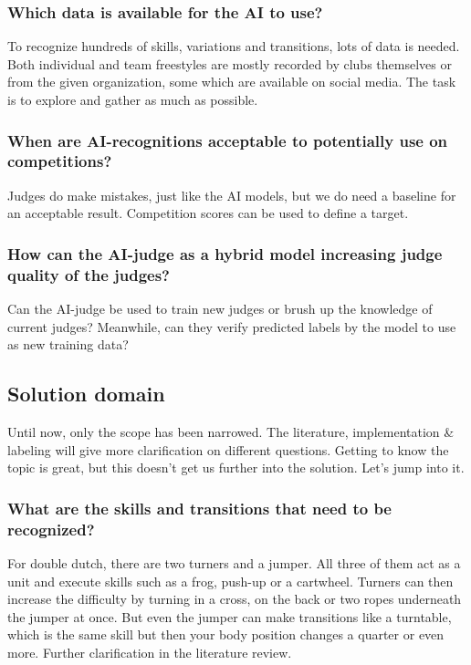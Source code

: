 \subsubsection{Which data is available for the AI to use?}
\label{subsubsec:intro-question-data}

To recognize hundreds of skills, variations and transitions, lots of data is needed. Both individual and team freestyles are mostly recorded by clubs themselves or from the given organization, some which are available on social media. The task is to explore and gather as much as possible.

\subsubsection{When are AI-recognitions acceptable to potentially use on competitions?}
\label{subsubsec:intro-question-acceptable-results}

Judges do make mistakes, just like the AI models, but we do need a baseline for an acceptable result. Competition scores can be used to define a target.

\subsubsection{How can the AI-judge as a hybrid model increasing judge quality of the judges?}
\label{subsubsec:intro-question-hybrid-model-judge-quality}
Can the AI-judge be used to train new judges or brush up the knowledge of current judges? Meanwhile, can they verify predicted labels by the
model to use as new training data?


\subsection{Solution domain}
\label{subsec:intro-solution-domain}

Until now, only the scope has been narrowed. The literature, implementation \& labeling will give more clarification on different questions. Getting to know the topic is great, but this doesn't get us further into the solution. Let's jump into it.

\subsubsection{What are the skills and transitions that need to be recognized?}
\label{subsubsec:intro-question-what-are-the-skill}

For double dutch, there are two turners and a jumper. All three of them act as a unit and execute skills such as a frog, push-up or a cartwheel. Turners can then increase the difficulty by turning in a cross, on the back or two ropes underneath the jumper at once. But even the jumper can make transitions like a turntable, which is the same skill but then your body position changes a quarter or even more. Further clarification in the literature review.

